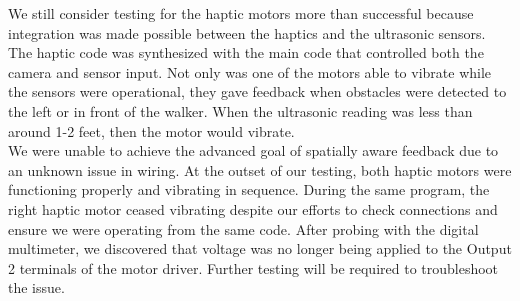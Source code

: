 \noindent We still consider testing for the haptic motors more than successful because integration was made possible between the haptics and the ultrasonic sensors. The haptic code was synthesized with the main code that controlled both the camera and sensor input. Not only was one of the motors able to vibrate while the sensors were operational, they gave feedback when obstacles were detected to the left or in front of the walker. When the ultrasonic reading was less than around 1-2 feet, then the motor would vibrate.\\

\noindent We were unable to achieve the advanced goal of spatially aware feedback due to an unknown issue in wiring. At the outset of our testing, both haptic motors were functioning properly and vibrating in sequence. During the same program, the right haptic motor ceased vibrating despite our efforts to check connections and ensure we were operating from the same code. After probing with the digital multimeter, we discovered that voltage was no longer being applied to the Output 2 terminals of the motor driver. Further testing will be required to troubleshoot the issue.